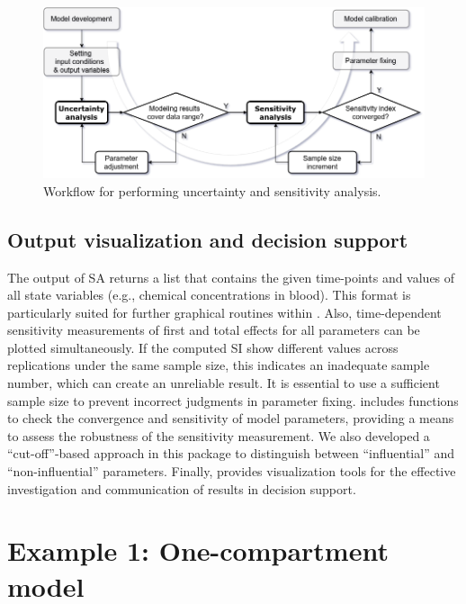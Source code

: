 \begin{Schunk}
\begin{figure}
\includegraphics[width=1\linewidth]{diagram/Workflow} \caption{\label{fig:Workflow}Workflow for performing uncertainty and sensitivity analysis.}\label{fig:workflow}
\end{figure}
\end{Schunk}

\hypertarget{output-visualization-and-decision-support}{%
\subsection{Output visualization and decision
support}\label{output-visualization-and-decision-support}}

The output of SA returns a list that contains the given time-points and
values of all state variables (e.g., chemical concentrations in blood).
This format is particularly suited for further graphical routines within
. Also, time-dependent sensitivity measurements of
first and total effects for all parameters can be plotted
simultaneously. If the computed SI show different values across
replications under the same sample size, this indicates an inadequate
sample number, which can create an unreliable result. It is essential to
use a sufficient sample size to prevent incorrect judgments in parameter
fixing.  includes functions to check the convergence
and sensitivity of model parameters, providing a means to assess the
robustness of the sensitivity measurement. We also developed a
``cut-off''-based approach in this package to distinguish between
``influential'' and ``non-influential'' parameters. Finally,
 provides visualization tools for the effective
investigation and communication of results in decision support.

\hypertarget{example-1-one-compartment-model}{%
\section{Example 1: One-compartment
model}\label{example-1-one-compartment-model}}


